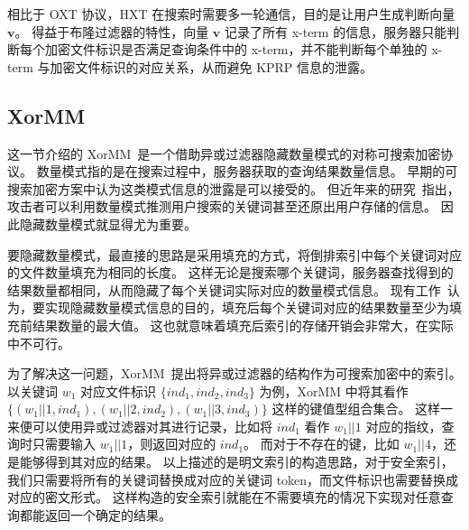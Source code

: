 相比于 OXT 协议，HXT 在搜索时需要多一轮通信，目的是让用户生成判断向量 $\mathbf{v}$。
%
得益于布隆过滤器的特性，向量 $\mathbf{v}$ 记录了所有 x-term 的信息，服务器只能判断每个加密文件标识是否满足查询条件中的 x-term，并不能判断每个单独的 x-term 与加密文件标识的对应关系，从而避免 KPRP 信息的泄露。


\subsection{XorMM}

这一节介绍的 XorMM~\cite{wang2022practical}是一个借助异或过滤器隐藏数量模式的对称可搜索加密协议。
数量模式指的是在搜索过程中，服务器获取的查询结果数量信息。
早期的可搜索加密方案中认为这类模式信息的泄露是可以接受的。
但近年来的研究~\cite{grubbs2018pump,gui2019encrypted,blackstone2020revisiting}指出，攻击者可以利用数量模式推测用户搜索的关键词甚至还原出用户存储的信息。
因此隐藏数量模式就显得尤为重要。

要隐藏数量模式，最直接的思路是采用填充的方式，将倒排索引中每个关键词对应的文件数量填充为相同的长度。
这样无论是搜索哪个关键词，服务器查找得到的结果数量都相同，从而隐藏了每个关键词实际对应的数量模式信息。
现有工作~\cite{ando2022cost}认为，要实现隐藏数量模式信息的目的，填充后每个关键词对应的结果数量至少为填充前结果数量的最大值。
这也就意味着填充后索引的存储开销会非常大，在实际中不可行。

为了解决这一问题，XorMM~\cite{wang2022practical}提出将异或过滤器的结构作为可搜索加密中的索引。
以关键词 $w_1$ 对应文件标识 $\{ind_1, ind_2, ind_3\}$ 为例，XorMM 中将其看作 $\{(w_1 ||1, ind_1), (w_1 || 2, ind_2), (w_1 || 3, ind_3)\}$ 这样的键值型组合集合。
这样一来便可以使用异或过滤器对其进行记录，比如将 $ind_1$ 看作 $w_1 || 1$ 对应的指纹，查询时只需要输入 $w_1 || 1$，则返回对应的 $ind_1$。
而对于不存在的键，比如 $w_1||4$，还是能够得到其对应的结果。
以上描述的是明文索引的构造思路，对于安全索引，我们只需要将所有的关键词替换成对应的关键词 token，而文件标识也需要替换成对应的密文形式。
这样构造的安全索引就能在不需要填充的情况下实现对任意查询都能返回一个确定的结果。

